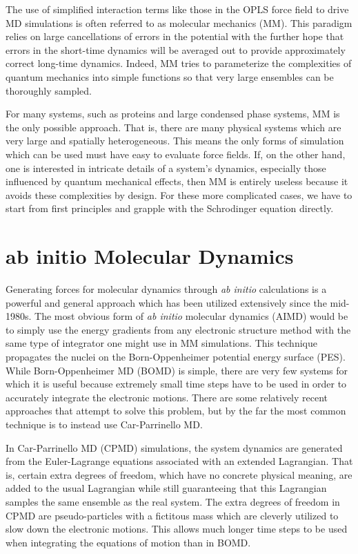 \documentclass[11pt, proquest]{uwthesis}[2020/02/24]
\begin{document}
\par The use of simplified interaction terms like those in the OPLS force field to drive MD simulations is often referred to as molecular mechanics\autocite{rappe_molecular_1997} (MM). This paradigm relies on large cancellations of errors in the potential with the further hope that errors in the short-time dynamics will be averaged out to provide approximately correct long-time dynamics. Indeed, MM tries to parameterize the complexities of quantum mechanics into simple functions so that very large ensembles can be thoroughly sampled.

\par For many systems, such as proteins and large condensed phase systems, MM is the only possible approach. That is, there are many physical systems which are very large and spatially heterogeneous. This means the only forms of simulation which can be used must have easy to evaluate force fields. If, on the other hand, one is interested in intricate details of a system's dynamics, especially those influenced by quantum mechanical effects, then MM is entirely useless because it avoids these complexities by design. For these more complicated cases, we have to start from first principles and grapple with the Schrodinger equation directly.

\section{ab initio Molecular Dynamics}

\par Generating forces for molecular dynamics through \textit{ab initio} calculations is a powerful and general approach which has been utilized extensively since the mid-1980s. The most obvious form of \textit{ab initio} molecular dynamics (AIMD) would be to simply use the energy gradients from any electronic structure method with the same type of integrator one might use in MM simulations. This technique propagates the nuclei on the Born-Oppenheimer potential energy surface (PES). While Born-Oppenheimer MD (BOMD) is simple, there are very few systems for which it is useful because extremely small time steps have to be used in order to accurately integrate the electronic motions. There are some relatively recent approaches that attempt to solve this problem\autocite{kuhne_efficient_2007}, but by the far the most common technique is to instead use Car-Parrinello MD\autocite{car_unified_1985}.

\par In Car-Parrinello MD (CPMD) simulations, the system dynamics are generated from the Euler-Lagrange equations associated with an extended Lagrangian. That is, certain extra degrees of freedom, which have no concrete physical meaning, are added to the usual Lagrangian while still guaranteeing that this Lagrangian samples the same ensemble as the real system. The extra degrees of freedom in CPMD are pseudo-particles with a fictitous mass which are cleverly utilized to slow down the electronic motions. This allows much longer time steps to be used when integrating the equations of motion than in BOMD.
\end{document}

